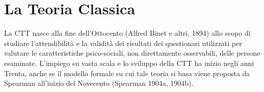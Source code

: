 %
%
%


\section{La Teoria Classica}

La CTT nasce alla fine dell'Ottocento (Alfred Binet e altri, 1894) allo scopo di studiare l'attendibilità e la validità dei risultati dei questionari utilizzati per valutare le caratteristiche psico-sociali, non direttamente osservabili, delle persone esaminate. 
L'impiego su vasta scala e lo sviluppo della CTT ha inizio negli anni Trenta, anche se il modello formale su cui tale teoria si basa viene proposta da Spearman all'inizio del Novecento (Spearman 1904a, 1904b). 

